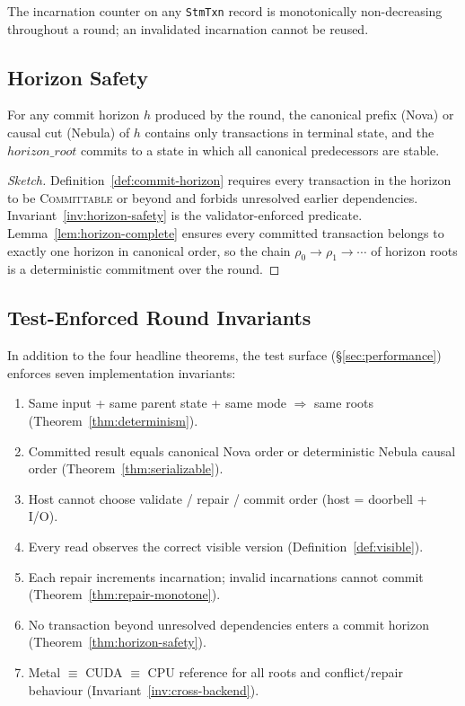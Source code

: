 \begin{invariant}
\label{inv:repair-monotone}
The incarnation counter on any \texttt{StmTxn} record is
monotonically non-decreasing throughout a round; an invalidated
incarnation cannot be reused.
\end{invariant}

\subsection{Horizon Safety}

\begin{theorem}
\label{thm:horizon-safety}
For any commit horizon $h$ produced by the round, the canonical
prefix (Nova) or causal cut (Nebula) of $h$ contains only
transactions in terminal state, and the $\mathit{horizon\_root}$
commits to a state in which all canonical predecessors are stable.
\end{theorem}

\begin{proof}[Sketch]
Definition~\ref{def:commit-horizon} requires every transaction in
the horizon to be \textsc{Committable} or beyond and forbids
unresolved earlier dependencies. Invariant~\ref{inv:horizon-safety}
is the validator-enforced predicate. Lemma~\ref{lem:horizon-complete}
ensures every committed transaction belongs to exactly one horizon
in canonical order, so the chain
$\rho_0 \to \rho_1 \to \cdots$
of horizon roots is a deterministic commitment over the round.
\end{proof}

\subsection{Test-Enforced Round Invariants}

In addition to the four headline theorems, the test surface
(\S\ref{sec:performance}) enforces seven implementation invariants:

\begin{enumerate}[leftmargin=2em,nosep]
\item Same input + same parent state + same mode $\Rightarrow$
      same roots (Theorem~\ref{thm:determinism}).
\item Committed result equals canonical Nova order or deterministic
      Nebula causal order (Theorem~\ref{thm:serializable}).
\item Host cannot choose validate / repair / commit order
      (host = doorbell + I/O).
\item Every read observes the correct visible version
      (Definition~\ref{def:visible}).
\item Each repair increments incarnation; invalid incarnations
      cannot commit (Theorem~\ref{thm:repair-monotone}).
\item No transaction beyond unresolved dependencies enters a commit
      horizon (Theorem~\ref{thm:horizon-safety}).
\item Metal $\equiv$ CUDA $\equiv$ CPU reference for all roots
      and conflict/repair behaviour
      (Invariant~\ref{inv:cross-backend}).
\end{enumerate}


